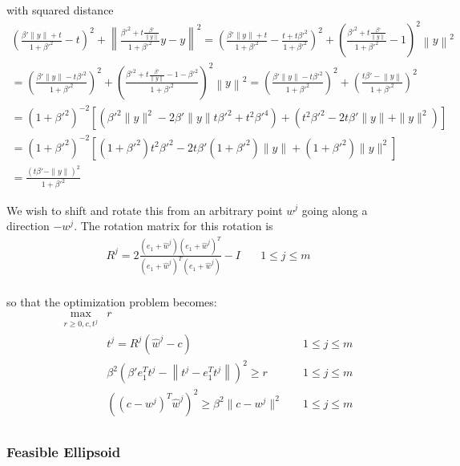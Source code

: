 \documentclass{article}
\theoremstyle{case}
\begin{document}
with squared distance
\begin{align*}
\left(\frac{{\beta'} \|y\| + t}{1 + {\beta'} ^ 2} - t\right)^2 + \left\|\frac{{\beta'} ^ 2 + t \frac {{\beta'}}{\|y\|}}{1 + {\beta'} ^ 2}y - y\right\|^2
= \left(\frac{{\beta'} \|y\| + t}{1 + {\beta'} ^ 2} - \frac{t + t{\beta'} ^ 2}{1 + {\beta'} ^ 2}\right)^2 + \left(\frac{{\beta'} ^ 2 + t \frac {{\beta'}}{\|y\|}}{1 + {\beta'} ^ 2} - 1\right)^2\left\|y\right\|^2 \\
= \left(\frac{{\beta'} \|y\| - t{\beta'}^2}{1 + {\beta'} ^ 2}\right)^2 + \left(\frac{{\beta'} ^ 2 + t \frac {{\beta'}}{\|y\|} - 1 - {\beta'} ^ 2}{1 + {\beta'} ^ 2}\right)^2\left\|y\right\|^2 
= \left(\frac{{\beta'} \|y\| - t{\beta'}^2}{1 + {\beta'} ^ 2}\right)^2 + \left(\frac{t {\beta'} - \left\|y\right\|}{1 + {\beta'} ^ 2}\right)^2 \\
= \left(1 + {\beta'}^2\right)^{-2}\left[\left({\beta'}^2 \|y\|^2 - 2\beta' \|y\| t {\beta'}^2  + t^2 {\beta'}^4\right) + \left(t^2{\beta'}^2 - 2 t {\beta'} \|y\| + \|y\|^2\right) \right] \\
= \left(1 + {\beta'}^2\right)^{-2}\left[
\left(1 + {\beta'}^2\right)t^2{\beta'}^2 - 2t{\beta'}\left(1 + {\beta'}^2\right) \|y\| + \left(1 + {\beta'}^2\right)\|y\|^2
\right] \\
= \frac{\left(t \beta' - \|y\|\right)^2}{1 + {\beta'}^2}
\end{align*}

We wish to shift and rotate this from an arbitrary point $w^j$ going along a direction $-w^j$.
The rotation matrix for this rotation is 
\begin{align*}
R^j = 2 \frac{(e_1 + \hat w^j)(e_1 + \hat w^j)^T}{(e_1 + \hat w^j)^T(e_1 + \hat w^j)} - I  & \quad 1 \le j \le m \\
\end{align*}

so that the optimization problem becomes:
\begin{align*}
\max_{r \ge 0, c, t^j}	& r & \\
					& t^j = R^j({\hat w}^j - c) 																		& \quad 1 \le j \le m \\
					& \beta^2 \left(\beta' e_1^T t^j - \left\|t^j - e_1^T t^j\right\|\right)^2 \ge r			& \quad 1 \le j \le m \\
					& \left(\left(c - w^j\right)^T\hat w^j\right)^2 \ge \beta^2 \|c - w^j\|^2											& \quad 1 \le j \le m \\
\end{align*}


\subsubsection{Feasible Ellipsoid}
\end{document}
